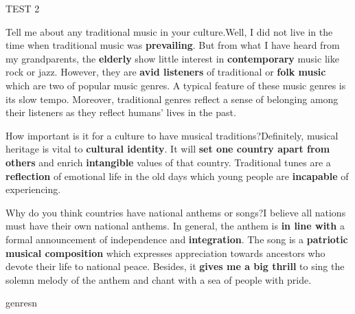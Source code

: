 \begin{glossarymc}[Cambridge 5]
\begin{test}{TEST 2}
    \begin{qa}{Tell me about any traditional music in your culture.}{Well, I did not live in the time when traditional music was \textbf{prevailing}. But from what I have heard from my grandparents, the \textbf{elderly} show little interest in \textbf{contemporary} music like rock or jazz. However, they are \textbf{avid listeners} of traditional or \textbf{folk music} which are two of popular music genres. A typical feature of these music genres is its slow tempo. Moreover, traditional genres reflect a sense of belonging among their listeners as they reflect humans' lives in the past.}
    \end{qa}

    \begin{qa}{How important is it for a culture to have musical traditions?}{Definitely, musical heritage is vital to \textbf{cultural identity}. It will \textbf{set one country apart from others} and enrich \textbf{intangible} values of that country. Traditional tunes are a \textbf{reflection} of emotional life in the old days which young people are \textbf{incapable} of experiencing.}
    \end{qa}

    \begin{qa}{Why do you think countries have national anthems or songs?}{I believe all nations must have their own national anthems. In general, the anthem is \textbf{in line with} a formal announcement of independence and \textbf{integration}. The song is a \textbf{patriotic} \textbf{musical composition} which expresses appreciation towards ancestors who devote their life to national peace. Besides, it \textbf{gives me a big thrill} to sing the solemn melody of the anthem and chant with a sea of people with pride.}
    \end{qa}

        \begin{VocabExplain}[Part 3]
            \begin{ExplainCard}{genres}{n}
            \end{ExplainCard}


\end{VocabExplain}
\end{test}
\end{glossarymc}
